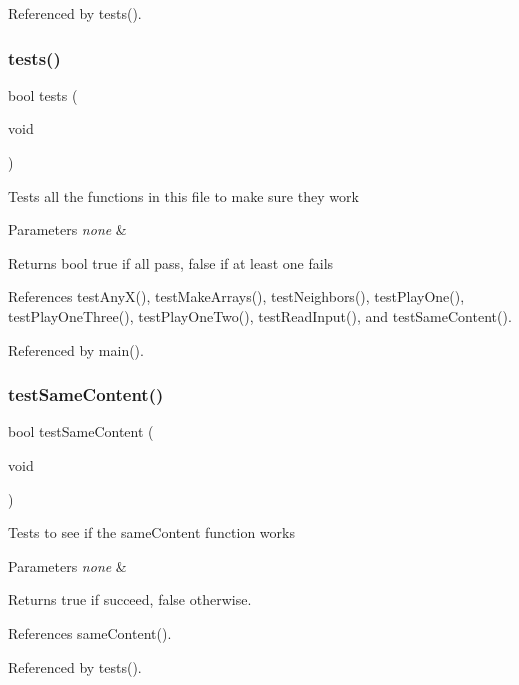 Referenced by tests().

\mbox{\label{tests_8c_a5e6e6e78df62797046c9ea173550a68a}} 
\subsubsection{tests()}
{\footnotesize\ttfamily bool tests (\begin{DoxyParamCaption}\item[{void}]{ }\end{DoxyParamCaption})}

Tests all the functions in this file to make sure they work 
\begin{DoxyParams}{Parameters}
{\em none} & \\
\hline
\end{DoxyParams}
\begin{DoxyReturn}{Returns}
bool true if all pass, false if at least one fails 
\end{DoxyReturn}


References test\+Any\+X(), test\+Make\+Arrays(), test\+Neighbors(), test\+Play\+One(), test\+Play\+One\+Three(), test\+Play\+One\+Two(), test\+Read\+Input(), and test\+Same\+Content().



Referenced by main().

\mbox{\label{tests_8c_a7017056d6783f53023d1f1f0336d3d3e}} 
\subsubsection{test\+Same\+Content()}
{\footnotesize\ttfamily bool test\+Same\+Content (\begin{DoxyParamCaption}\item[{void}]{ }\end{DoxyParamCaption})}

Tests to see if the same\+Content function works 
\begin{DoxyParams}{Parameters}
{\em none} & \\
\hline
\end{DoxyParams}
\begin{DoxyReturn}{Returns}
true if succeed, false otherwise. 
\end{DoxyReturn}


References same\+Content().



Referenced by tests().

